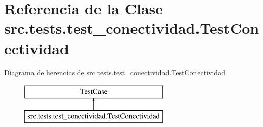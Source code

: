 \hypertarget{classsrc_1_1tests_1_1test__conectividad_1_1_test_conectividad}{\section{Referencia de la Clase src.\-tests.\-test\-\_\-conectividad.\-Test\-Conectividad}
\label{classsrc_1_1tests_1_1test__conectividad_1_1_test_conectividad}
}
Diagrama de herencias de src.\-tests.\-test\-\_\-conectividad.\-Test\-Conectividad\begin{figure}[H]
\begin{center}
\leavevmode
\includegraphics[height=2.000000cm]{classsrc_1_1tests_1_1test__conectividad_1_1_test_conectividad}
\end{center}
\end{figure}
